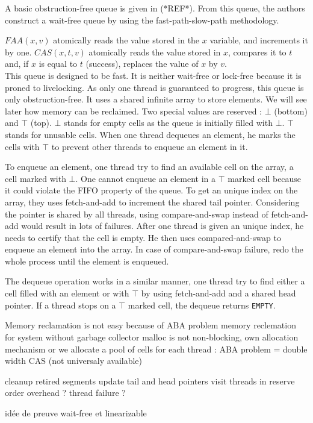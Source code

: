 A basic obstruction-free queue is given in (*REF*). From this queue, the authors
construct a wait-free queue by using the fast-path-slow-path methodology.

$FAA(x, v)$ atomically reads the value stored in the $x$ variable, and
increments it by one. $CAS(x, t, v)$ atomically reads the value stored in $x$,
compares it to $t$ and, if $x$ is equal to $t$ (success), replaces the value of
$x$ by $v$. \\

 This queue is designed to be fast. It is neither wait-free or lock-free because
it is proned to livelocking. As only one thread is guaranteed to progress, this
queue is only obstruction-free. It uses a shared infinite array to store
elements. We will see later how memory can be reclaimed. Two special values are
reserved : $\bot$ (bottom) and $\top$ (top). $\bot$ stands for empty cells as
the queue is initially filled with $\bot$. $\top$ stands for unusable cells.
When one thread dequeues an element, he marks the cells with $\top$ to prevent
other threads to enqueue an element in it.

To enqueue an element, one thread try to find an available cell on the array, a
cell marked with $\bot$. One cannot enqueue an element in a $\top$ marked cell
because it could violate the FIFO property of the queue. To get an unique index
on the array, they uses fetch-and-add to increment the shared tail pointer.
Considering the pointer is shared by all threads, using compare-and-swap instead
of fetch-and-add would result in lots of failures. After one thread is given an
unique index, he needs to certify that the cell is empty. He then uses
compared-and-swap to enqueue an element into the array. In case of
compare-and-swap failure, redo the whole process until the element is enqueued.

The dequeue operation works in a similar manner, one thread try to find either a
cell filled with an element or with $\top$ by using fetch-and-add and a shared
head pointer. If a thread stops on a $\top$ marked cell, the dequeue returns
\texttt{EMPTY}.



Memory reclamation is not easy because of ABA problem
memory reclemation for system without garbage collector
malloc is not non-blocking, own allocation mechanism or we allocate a pool of
cells for each thread : ABA problem = double width CAS (not universaly
available)

cleanup retired segments
update tail and head pointers
visit threads in reserve order
overhead ?
thread failure ?

idée de preuve wait-free et linearizable
